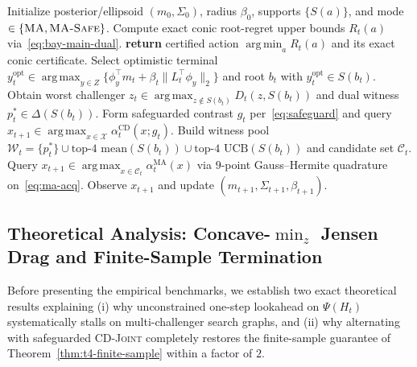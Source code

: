 \documentclass{article}
\theoremstyle{plain}
\theoremstyle{definition}
\DeclareMathOperator*{\argmax}{arg\,max}
\DeclareMathOperator*{\argmin}{arg\,min}
\begin{document}
\begin{algorithm}[!htbp]
\caption{\textsc{MA-CD-Joint} and \textsc{MA-CD-Joint-Safe} ($q=2$)}
\label{alg:ma-cd-joint}
\begin{algorithmic}[1]
\STATE Initialize posterior/ellipsoid $(m_0, \Sigma_0)$, radius $\beta_0$, supports $\{S(a)\}$, and mode $\in \{\textsc{MA}, \textsc{MA-Safe}\}$.
  \STATE Compute exact conic root-regret upper bounds $R_t(a)$ via~\eqref{eq:bay-main-dual}.
    \STATE \textbf{return} certified action $\argmin_a R_t(a)$ and its exact conic certificate.
  \ENDIF
  \STATE Select optimistic terminal $y_t^{\mathrm{opt}} \in \argmax_{y \in Z} \{\phi_y^\top m_t + \beta_t \|L_t^\top \phi_y\|_2\}$ and root $b_t$ with $y_t^{\mathrm{opt}} \in S(b_t)$.
  \STATE Obtain worst challenger $z_t \in \argmax_{z \notin S(b_t)} D_t(z, S(b_t))$ and dual witness $p_t^* \in \Delta(S(b_t))$.
    \STATE Form safeguarded contrast $g_t$ per~\eqref{eq:safeguard} and query $x_{t+1} \in \argmax_{x \in \mathcal{X}} \alpha_t^{\mathrm{CD}}(x; g_t)$.
  \ELSE
    \STATE Build witness pool $\mathcal{W}_t = \{p_t^*\} \cup \text{top-}4\text{ mean}(S(b_t)) \cup \text{top-}4\text{ UCB}(S(b_t))$ and candidate set $\mathcal{C}_t$.
    \STATE Query $x_{t+1} \in \argmax_{x \in \mathcal{C}_t} \alpha_t^{\mathrm{MA}}(x)$ via $9$-point Gauss--Hermite quadrature on~\eqref{eq:ma-acq}.
  \ENDIF
  \STATE Observe $x_{t+1}$ and update $(m_{t+1}, \Sigma_{t+1}, \beta_{t+1})$.
\ENDFOR
\end{algorithmic}
\end{algorithm}

\subsection{Theoretical Analysis: Concave-\texorpdfstring{$\min_z$}{min\_z} Jensen Drag and Finite-Sample Termination}
\label{app:ma-theory}

Before presenting the empirical benchmarks, we establish two exact theoretical results explaining (i) why unconstrained one-step lookahead on $\Psi(H_t)$ systematically stalls on multi-challenger search graphs, and (ii) why alternating with safeguarded \textsc{CD-Joint} completely restores the finite-sample guarantee of Theorem~\ref{thm:t4-finite-sample} within a factor of $2$.
\end{document}
